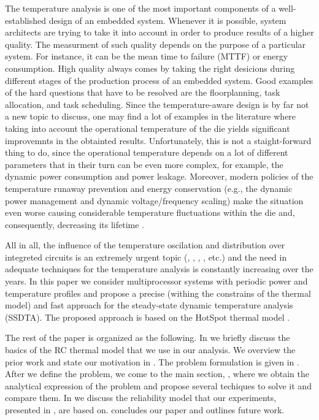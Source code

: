 The temperature analysis is one of the most important components of a well-established design of an embedded system. Whenever it is possible, system architects are trying to take it into account in order to produce results of a higher quality. The measurment of such quality depends on the purpose of a particular system. For instance, it can be the mean time to failure (MTTF) or energy consumption. High quality always comes by taking the right desicions during different stages of the production process of an embedded system. Good examples of the hard questions that have to be resolved are the floorplanning, task allocation, and task scheduling. Since the temperature-aware design is by far not a new topic to discuss, one may find a lot of examples in the literature where taking into account the operational temperature of the die yields significant improvemnts in the obtainted results. Unfortunately, this is not a staight-forward thing to do, since the operational temperature depends on a lot of different parameters that in their turn can be even more complex, for example, the dynamic power consumption and power leakage. Moreover, modern policies of the temperature runaway prevention and energy conservation (e.g., the dynamic power management and dynamic voltage/frequency scaling) make the situation even worse causing considerable temperature fluctuations within the die and, consequently, decreasing its lifetime \cite{simunic2005}.

All in all, the influence of the temperature oscilation and distribution over integreted circuits is an extremely urgent topic (\cite{hieu2004}, \cite{lu2004}, \cite{jedec2010}, \cite{xiang2010}, etc.) and the need in adequate techniques for the temperature analysis is constantly increasing over the years. In this paper we consider multiprocessor systems with periodic power and temperature profiles and propose a precise (withing the constrains of the thermal model) and fast approach for the steady-state dynamic temperature analysis (SSDTA). The proposed approach is based on the HotSpot thermal model \cite{huang2006}.

The rest of the paper is organized as the following. In  we briefly discuss the basics of the RC thermal model that we use in our analysis. We overview the prior work and state our motivation in . The problem formulation is given in . After we define the problem, we come to the main section, , where we obtain the analytical expression of the problem and propose several techiques to solve it and compare them. In  we discuss the reliability model that our experiments, presented in , are based on.  concludes our paper and outlines future work.
